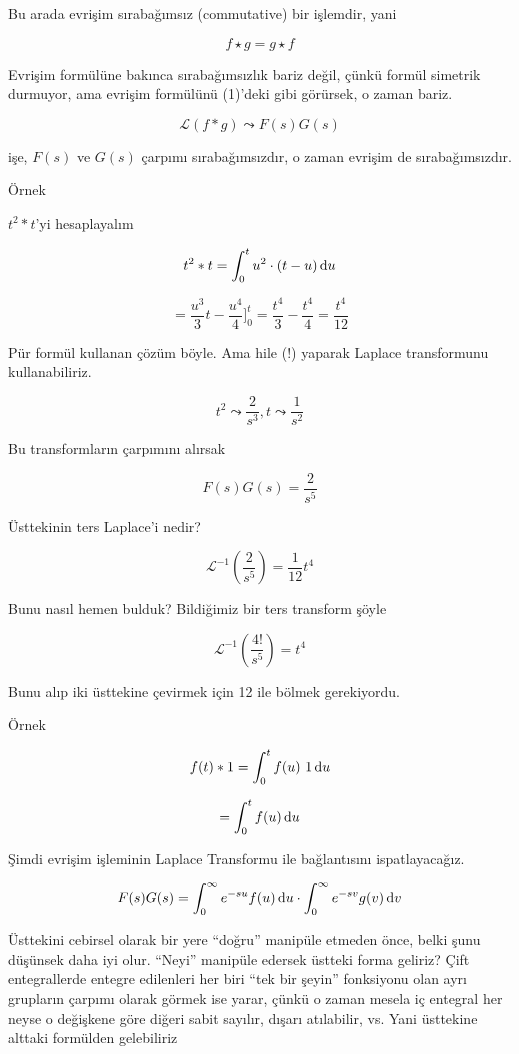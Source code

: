 \documentclass[12pt,fleqn]{article}\usepackage{../../common}
\begin{document}
Bu arada evrişim sırabağımsız (commutative) bir işlemdir, yani 

$$ 
f \star g = g \star f 
$$

Evrişim formülüne bakınca sırabağımsızlık bariz değil, çünkü formül simetrik
durmuyor, ama evrişim formülünü (1)'deki gibi görürsek, o zaman bariz.

$$ \mathcal{L} (f*g) \leadsto F(s)G(s) $$

işe, $F(s)$ ve $G(s)$ çarpımı sırabağımsızdır, o zaman evrişim de
sırabağımsızdır.

Örnek

$t^2 * t$'yi hesaplayalım

$$
t^2 * t =\int_0^t u^2 \cdot (t - u) \,\mathrm{d} u
$$

$$ = \frac{u^3}{3}t - \frac{u^4}{4} \bigg]_{0}^{t} = 
\frac{t^4}{3} - \frac{t^4}{4} =
\frac{t^4}{12}
$$

Pür formül kullanan çözüm böyle. Ama hile (!) yaparak Laplace transformunu
kullanabiliriz.

$$ t^2 \leadsto \frac{2}{s^3}, t \leadsto \frac{1}{s^2} $$

Bu transformların çarpımını alırsak 

$$F(s)G(s) = \frac{2}{s^5} $$


Üsttekinin ters Laplace'i nedir? 

$$ \mathcal{L}^{-1}(\frac{2}{s^5}) = \frac{1}{12}t^4 $$

Bunu nasıl hemen bulduk? Bildiğimiz bir ters transform şöyle

$$ \mathcal{L}^{-1}(\frac{4!}{s^5}) = t^4 $$

Bunu alıp iki üsttekine çevirmek için 12 ile bölmek gerekiyordu.

Örnek

$$ f(t) * 1 = \int_0^t f(u) \ 1 \,\mathrm{d} u $$

$$  = \int_0^t f(u) \,\mathrm{d} u $$

Şimdi evrişim işleminin Laplace Transformu ile bağlantısını ispatlayacağız. 

$$ F(s)G(s) = \int_0^{\infty}  e^{-su}f(u) \,\mathrm{d} u \cdot  
\int_0^{\infty}  e^{-sv} g(v) \,\mathrm{d} v
$$

Üsttekini cebirsel olarak bir yere ``doğru'' manipüle etmeden önce, belki şunu
düşünsek daha iyi olur. ``Neyi'' manipüle edersek üstteki forma geliriz? Çift
entegrallerde entegre edilenleri her biri ``tek bir şeyin'' fonksiyonu olan ayrı
grupların çarpımı olarak görmek ise yarar, çünkü o zaman mesela iç entegral her
neyse o değişkene göre diğeri sabit sayılır, dışarı atılabilir, vs. Yani
üsttekine alttaki formülden gelebiliriz
\end{document}
